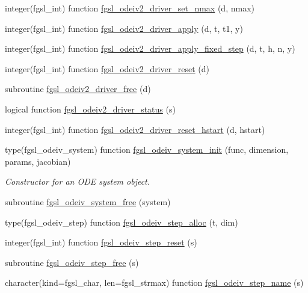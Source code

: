 \begin{DoxyCompactItemize}
\item 
integer(fgsl\+\_\+int) function \hyperlink{ode_8finc_a672eeb10000330826020da95ce99c391}{fgsl\+\_\+odeiv2\+\_\+driver\+\_\+set\+\_\+nmax} (d, nmax)
\item 
integer(fgsl\+\_\+int) function \hyperlink{ode_8finc_a6cd36ae8668cd6a69d3d8b4200df210d}{fgsl\+\_\+odeiv2\+\_\+driver\+\_\+apply} (d, t, t1, y)
\item 
integer(fgsl\+\_\+int) function \hyperlink{ode_8finc_a9eedde9d2faadc18f0d952e48b364f04}{fgsl\+\_\+odeiv2\+\_\+driver\+\_\+apply\+\_\+fixed\+\_\+step} (d, t, h, n, y)
\item 
integer(fgsl\+\_\+int) function \hyperlink{ode_8finc_abf08671d0ef862295d6bf5fd2b9733b2}{fgsl\+\_\+odeiv2\+\_\+driver\+\_\+reset} (d)
\item 
subroutine \hyperlink{ode_8finc_a1bd2c2d5a3b6758b0a2bf84c64e14c49}{fgsl\+\_\+odeiv2\+\_\+driver\+\_\+free} (d)
\item 
logical function \hyperlink{ode_8finc_af058bdba2f220e7f306c7dac6fefc7e8}{fgsl\+\_\+odeiv2\+\_\+driver\+\_\+status} (s)
\item 
integer(fgsl\+\_\+int) function \hyperlink{ode_8finc_a8428de6bbc5fb897c3795b911a805435}{fgsl\+\_\+odeiv2\+\_\+driver\+\_\+reset\+\_\+hstart} (d, hstart)
\item 
type(fgsl\+\_\+odeiv\+\_\+system) function \hyperlink{ode_8finc_ac5419ee4b9617d0020895e1f452e0ec8}{fgsl\+\_\+odeiv\+\_\+system\+\_\+init} (func, dimension, params, jacobian)
\begin{DoxyCompactList}\small\item\em Constructor for an O\+D\+E system object. \end{DoxyCompactList}\item 
subroutine \hyperlink{ode_8finc_a4fad8d181c7842450901cd34bf9902c5}{fgsl\+\_\+odeiv\+\_\+system\+\_\+free} (system)
\item 
type(fgsl\+\_\+odeiv\+\_\+step) function \hyperlink{ode_8finc_ad80515e2f8704ae9c376357ff184c0b5}{fgsl\+\_\+odeiv\+\_\+step\+\_\+alloc} (t, dim)
\item 
integer(fgsl\+\_\+int) function \hyperlink{ode_8finc_a550b05385e72fdf0e9c8febe9d9c0556}{fgsl\+\_\+odeiv\+\_\+step\+\_\+reset} (s)
\item 
subroutine \hyperlink{ode_8finc_ae2d74056a3dd23aaf31cd48dd757a987}{fgsl\+\_\+odeiv\+\_\+step\+\_\+free} (s)
\item 
character(kind=fgsl\+\_\+char, len=fgsl\+\_\+strmax) function \hyperlink{ode_8finc_a1266ca2607d99bd8f30801f7c5837f6b}{fgsl\+\_\+odeiv\+\_\+step\+\_\+name} (s)

\end{DoxyCompactItemize}
